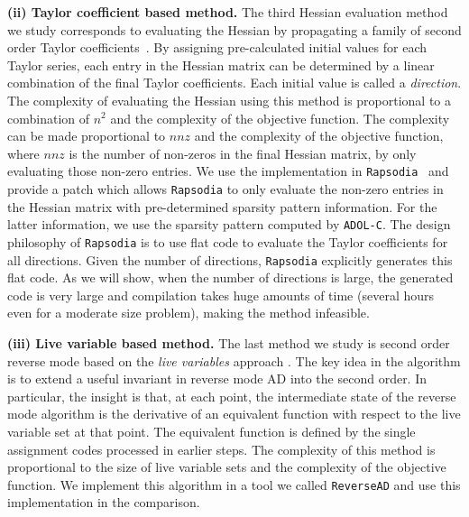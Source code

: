 \documentclass[11pt, a4paper, english]{article}
\begin{document}
{\bf (ii) Taylor coefficient based method. } 
The third Hessian evaluation method  we study  corresponds to evaluating the Hessian by propagating a family of second order Taylor coefficients~\cite{griewank2000evaluating}. 
By assigning pre-calculated initial values for each Taylor series, each entry in the Hessian matrix  can be determined by a linear combination of the final Taylor coefficients. Each initial value is called a {\em direction}.
The complexity of evaluating the Hessian using this method is proportional to a combination of $n^2$ and the complexity of the objective function. The complexity can be made proportional to $nnz$ and the complexity of the objective function, where $nnz$ is the number of non-zeros in the final Hessian matrix, by only evaluating those non-zero entries.
We use the implementation in {\tt Rapsodia}~\cite{charpentier2009fast} and provide a patch which allows {\tt Rapsodia} to only evaluate the non-zero entries in the Hessian matrix with pre-determined sparsity pattern information. For the latter information, we use the sparsity pattern computed by {\tt ADOL-C}. The design philosophy of {\tt Rapsodia} is to use flat code to evaluate the Taylor coefficients for all directions. Given the number of directions, {\tt Rapsodia} explicitly generates this flat code. As we will show, when the number of directions is large, the generated code is very large and compilation takes huge amounts of time (several hours even for a moderate size problem), making the method infeasible. 

{\bf (iii) Live variable based method. }
The last method we study is second order reverse mode based on the {\em live variables} approach \cite{wang2016capitalizing}. The key idea in the algorithm is to extend a useful invariant in reverse mode AD into the second order. In particular, the insight is that, at each point, the intermediate state of the reverse mode algorithm is the derivative of an equivalent function with respect to the live variable set at that point. The equivalent function is defined by the single assignment codes processed in earlier steps. The complexity of this method is proportional to the size of live variable sets and the complexity of the objective function. We implement this algorithm in a tool we called {\tt ReverseAD} and use this implementation in the comparison.
\end{document}
